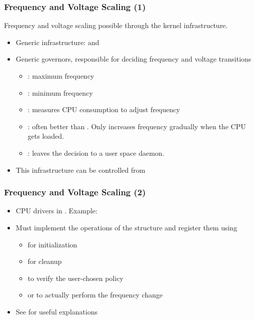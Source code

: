 \begin{frame}
  \frametitle{Frequency and Voltage Scaling (1)}
  Frequency and voltage scaling possible through the
   kernel infrastructure.
  \begin{itemize}
  \item Generic infrastructure:  and
  \item Generic governors, responsible for deciding frequency and
    voltage transitions
    \begin{itemize}
    \item {}: maximum frequency
    \item {}: minimum frequency
    \item {}: measures CPU consumption to adjust frequency
    \item {}: often better than
      . Only increases frequency gradually when the
      CPU gets loaded.
    \item {}: leaves the decision to a user space
      daemon.
    \end{itemize}
  \item This infrastructure can be controlled from
  \end{itemize}
\end{frame}

\begin{frame}
  \frametitle{Frequency and Voltage Scaling (2)}
  \begin{itemize}
  \item CPU drivers in .  Example:
  \item Must implement the operations of the 
    structure and register them using 
    \begin{itemize}
    \item {} for initialization
    \item {} for cleanup
    \item {} to verify the user-chosen policy
    \item {} or  to actually perform
      the frequency change
    \end{itemize}
  \item See  for useful explanations
  \end{itemize}
\end{frame}

